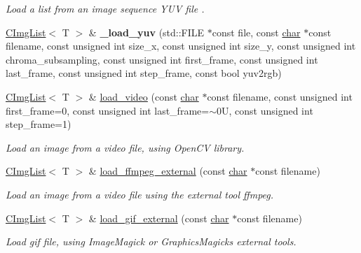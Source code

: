 \begin{DoxyCompactItemize}
\begin{DoxyCompactList}\small\item\em Load a list from an image sequence Y\+UV file . \end{DoxyCompactList}\item 
\mbox{\label{structcimg__library__suffixed_1_1CImgList_acdbd0db44c3746e62fb05c914c4fbb1f}} 
\hyperlink{structcimg__library__suffixed_1_1CImgList}{C\+Img\+List}$<$ T $>$ \& {\bfseries \+\_\+load\+\_\+yuv} (std\+::\+F\+I\+LE $\ast$const file, const \hyperlink{classchar}{char} $\ast$const filename, const unsigned int size\+\_\+x, const unsigned int size\+\_\+y, const unsigned int chroma\+\_\+subsampling, const unsigned int first\+\_\+frame, const unsigned int last\+\_\+frame, const unsigned int step\+\_\+frame, const bool yuv2rgb)
\item 
\hyperlink{structcimg__library__suffixed_1_1CImgList}{C\+Img\+List}$<$ T $>$ \& \hyperlink{structcimg__library__suffixed_1_1CImgList_a23a2c8ad55006cc12ef5316355e46ea0}{load\+\_\+video} (const \hyperlink{classchar}{char} $\ast$const filename, const unsigned int first\+\_\+frame=0, const unsigned int last\+\_\+frame=$\sim$0\+U, const unsigned int step\+\_\+frame=1)
\begin{DoxyCompactList}\small\item\em Load an image from a video file, using Open\+CV library. \end{DoxyCompactList}\item 
\hyperlink{structcimg__library__suffixed_1_1CImgList}{C\+Img\+List}$<$ T $>$ \& \hyperlink{structcimg__library__suffixed_1_1CImgList_aa1c97a6c05ba746d02440eec0ad2e602}{load\+\_\+ffmpeg\+\_\+external} (const \hyperlink{classchar}{char} $\ast$const filename)
\begin{DoxyCompactList}\small\item\em Load an image from a video file using the external tool \textquotesingle{}ffmpeg\textquotesingle{}. \end{DoxyCompactList}\item 
\hyperlink{structcimg__library__suffixed_1_1CImgList}{C\+Img\+List}$<$ T $>$ \& \hyperlink{structcimg__library__suffixed_1_1CImgList_a222371272a0ca7a6d6d30a380bc0a92d}{load\+\_\+gif\+\_\+external} (const \hyperlink{classchar}{char} $\ast$const filename)
\begin{DoxyCompactList}\small\item\em Load gif file, using Image\+Magick or Graphics\+Magick\textquotesingle{}s external tools. \end{DoxyCompactList}\item 

\end{DoxyCompactItemize}
